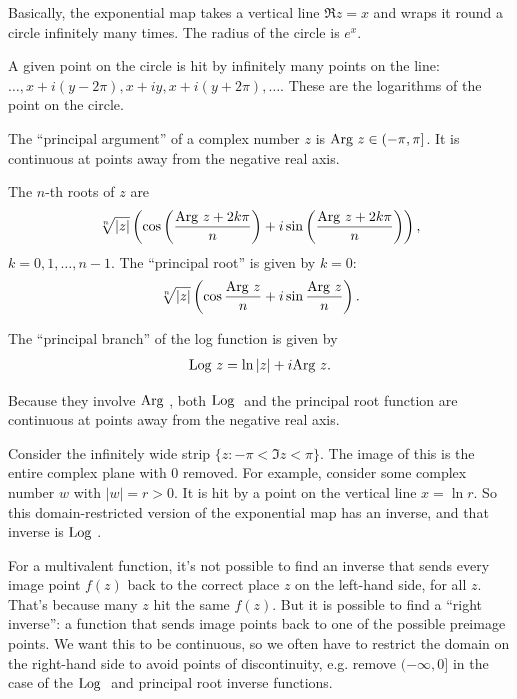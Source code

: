 \documentclass[12pt]{article}
\begin{document}
Basically, the exponential map takes a vertical line $\Re z = x$ and wraps it
round a circle infinitely many times. The radius of the circle is $e^x$.

A given point on the circle is hit by infinitely many points on the line:
$\ldots, x + i(y - 2\pi), x + iy, x + i(y + 2\pi), \ldots.$ These are the
logarithms of the point on the circle.


The ``principal argument'' of a complex number $z$ is $\text{Arg}~ z \in (-\pi,
\pi]$. It is continuous at points away from the negative real axis.

The $n$-th roots of $z$ are
\begin{align*}
  \sqrt[n] {|z|}\left(\cos\left(\frac{\text{Arg}~ z + 2k\pi}{n}\right) + i\sin\left(\frac{\text{Arg}~ z + 2k\pi}{n}\right)\right),
\end{align*}
$k = 0, 1, \ldots, n-1$.
The ``principal root'' is given by $k = 0$:
\begin{align*}
  \sqrt[n] {|z|}\left(\cos\frac{\text{Arg}~ z}{n} + i\sin\frac{\text{Arg}~ z}{n}\right).
\end{align*}

The ``principal branch'' of the log function is given by
\begin{align*}
  \text{Log}~ z = \ln |z| + i\text{Arg}~ z.
\end{align*}

Because they involve $\text{Arg}~$, both $\text{Log}~$ and the principal root function are
continuous at points away from the negative real axis.

Consider the infinitely wide strip $\{z: -\pi < \Im z < \pi\}$. The image of
this is the entire complex plane with 0 removed. For example, consider some
complex number $w$ with $|w| = r > 0$. It is hit by a point on the vertical line
$x = \ln r$. So this domain-restricted version of the exponential map has an
inverse, and that inverse is $\text{Log}~$.

For a multivalent function, it's not possible to find an inverse that sends
every image point $f(z)$ back to the correct place $z$ on the left-hand side,
for all $z$. That's because many $z$ hit the same $f(z)$. But it is possible to
find a ``right inverse'': a function that sends image points back to one of the
possible preimage points. We want this to be continuous, so we often have to
restrict the domain on the right-hand side to avoid points of discontinuity,
e.g. remove $(-\infty, 0]$ in the case of the $\text{Log}~$ and principal root inverse
functions.
\end{document}
